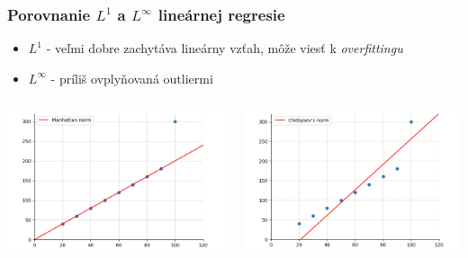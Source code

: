 \documentclass[presentation.tex]{subfiles}
\begin{document}
\begin{frame}
	\frametitle{Porovnanie $L^1$ a $L^{\infty}$ lineárnej regresie}
	
	\begin{itemize}
		\item $L^1$ - veľmi dobre zachytáva lineárny vzťah, môže viesť k \textit{overfittingu}
		\item $L^{\infty}$ - príliš ovplyňovaná outliermi
	\end{itemize}
	
	\begin{columns}
		\begin{column}{0.5\textwidth}
			\centering
			\includegraphics[width=0.8\linewidth]{../report/figs/L1_linear_with_outlier_cropped.png}
		\end{column}
		\begin{column}{0.5\textwidth}
			\centering
			\includegraphics[width=0.8\linewidth]{../report/figs/LInf_linear_with_outlier_cropped.png}
		\end{column}
	\end{columns}
	
\end{frame}
\end{document}
